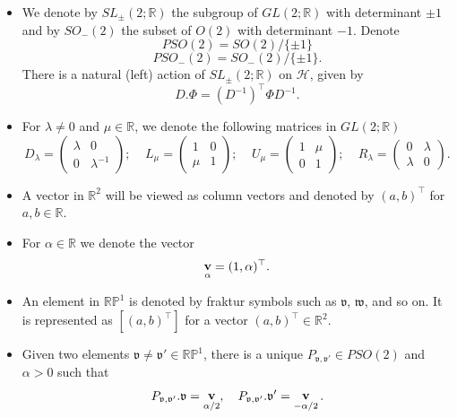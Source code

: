 \documentclass[a4paper,11pt]{amsart}
\theoremstyle{definition}
\numberwithin{equation}{section}
\newcommand{\R}{\mathbb{R}}
\newcommand{\dP}{\mathbb{P}}
\newcommand{\mv} {\mathfrak v}
\newcommand{\mw} {\mathfrak w}
\newcommand{\bP}{\mathbb P}
\DeclareMathOperator{\bv}{{\bf v}}
\begin{document}
\begin{itemize}
\item We denote by $SL_\pm(2; \R)$ the subgroup of $GL(2; \R)$ with determinant $\pm1$ and by $SO_-(2)$ the subset of $O(2)$ with determinant $-1$. Denote 
$$PSO(2)=SO(2)/\{\pm1\}$$
$$PSO_-(2)=SO_-(2)/\{\pm 1\}.$$
 There is a natural (left) action of $SL_\pm(2;\R)$ on $\mathcal H$, given by 
 \begin{equation}\label{eqn:group actionon Phi}D. \Phi=(D^{-1})^{\top}\Phi D^{-1}.
 \end{equation}
\item For $\lambda\neq 0$ and $\mu\in \R$, we denote the following matrices in $GL(2; \R)$
\begin{equation}\label{e:definition of matrices}D_\lambda=\left(\begin{matrix} \lambda &0\\ 0 & \lambda^{-1}\end{matrix} \right);
 \ \ \ \ \ 
	L_{\mu}=\left(\begin{matrix}
1 &0\\ \mu & 1	
\end{matrix}
\right);
\ \ \ \ \ 
	U_{\mu}=\left(\begin{matrix}
1 & \mu \\ 0 & 1	
\end{matrix}
\right);
\ \ \ \ \ 
	R_{\lambda}=\left(\begin{matrix}
0 & \lambda \\ \lambda & 0	
\end{matrix}
\right).
\end{equation}
\item A vector in $\R^2$ will be viewed as column vectors and denoted by $(a, b)^\top$ for $a, b\in \R$.
\item For $\alpha\in \R$ we denote the vector  
\begin{equation}\label{eqn: defintion of bvalpha}\bv_{\alpha}=(1,  \alpha)^{\top}.
\end{equation}
\item An element in $\R\dP^1$ is denoted  by fraktur symbols such as $\mv$, $\mw$, and so on. It is represented as $[(a, b)^\top]$ for a vector $(a, b)^{\top}\in \R^2$.
\item Given two elements $\mv\neq \mv'\in \R\bP^1$, there is a unique $P_{\mv, \mv'}\in PSO(2)$ and $\alpha>0$  such that 
\begin{equation}\label{e:definition of P}
    P_{\mv, \mv'}.\mv=\bv_{\alpha/2}, \quad P_{\mv, \mv'}.\mv'=\bv_{-{\alpha}/2}.
\end{equation}

\end{itemize}
\end{document}
